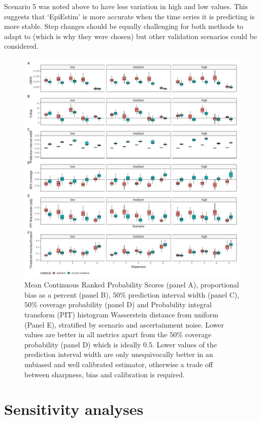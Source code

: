 \documentclass[a4paper, 12pt, twoside]{article}
\let\Oldsection\section
\renewcommand{\section}{\FloatBarrier\Oldsection}
\begin{document}
Scenario 5 was noted above to have less variation in high and low values. This suggests that `EpiEstim' is more accurate when the time series it is predicting is more stable. Step changes should be equally challenging for both methods to adapt to (which is why they were chosen) but other validation scenarios could be considered.

\begin{figure}[h!]
\centering
  \includegraphics{fig/fig4-metrics-by-scenario}
  \caption{Mean Continuous Ranked Probability Scores (panel A), proportional bias as a percent (panel B), 50\% prediction interval width (panel C), 50\% coverage probability (panel D) and Probability integral transform (PIT) histogram Wasserstein distance from uniform (Panel E), stratified by scenario and ascertainment noise. Lower values are better in all metrics apart from the 50\% coverage probability (panel D) which is ideally 0.5. Lower values of the prediction interval width are only unequivocally better in an unbiased and well calibrated estimator, otherwise a trade off between sharpness, bias and calibration is required.}
\label{fig:S4}
\end{figure}

\clearpage

\section{Sensitivity analyses}
\end{document}
